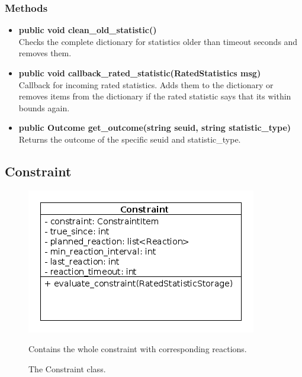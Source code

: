 \subsubsection{Methods}
\begin{itemize}
	\item \textbf{ public void clean\_old\_statistic() }\\
		Checks the complete dictionary for statistics older than timeout seconds and removes them.
	\item \textbf{ public void callback\_rated\_statistic(RatedStatistics msg) }\\
		Callback for incoming rated statistics. Adds them to the dictionary or removes items from the dictionary if the rated statistic says that its within bounds again. 
	\item \textbf{ public Outcome get\_outcome(string seuid, string statistic\_type) }\\
		Returns the outcome of the specific seuid and statistic\_type.
\end{itemize}

\newpage
\subsection{Constraint}
\begin{figure}[htbp]
	\begin{minipage}[t]{8cm}
		\vspace{0pt}
		\centering
		\includegraphics[scale=0.6]{./diagram_pictures/reactor/Constraint.png}
		\caption{The Constraint class.}
	\end{minipage}
	\hfill
	\begin{minipage}[t]{8cm}
		\vspace{10pt}
			Contains the whole constraint with corresponding reactions.
	\end{minipage}
\end{figure}  


